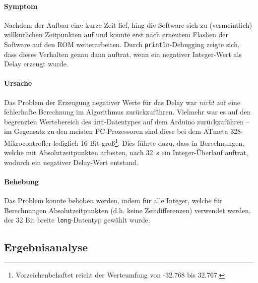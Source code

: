 \documentclass{kis}
\begin{document}
\paragraph{Symptom}
Nachdem der Aufbau eine kurze Zeit lief, hing die Software sich zu (vermeintlich) willkürlichen Zeitpunkten auf und konnte erst nach erneutem Flashen der Software auf den ROM weiterarbeiten. Durch \texttt{println}-Debugging zeigte sich, dass dieses Verhalten genau dann auftrat, wenn ein negativer Integer-Wert als Delay erzeugt wurde.

\paragraph{Ursache}
Das Problem der Erzeugung negativer Werte für das Delay war \emph{nicht} auf eine fehlerhafte Berechnung im Algorithmus zurückzuführen. Vielmehr war es auf den begrenzten Wertebereich des \texttt{int}-Datentypes auf dem Arduino zurückzuführen -- im Gegensatz zu den meisten PC-Prozessoren sind diese bei dem ATmeta 328-Mikrocontroller lediglich 16 Bit groß\footnote{Vorzeichenbehaftet reicht der Werteumfang von -32.768 bis 32.767.}. Dies führte dazu, dass in Berechnungen, welche mit Absolutzeitpunkten arbeiten, nach 32~s ein Integer-Überlauf auftrat, wodurch ein negativer Delay-Wert entstand.

\paragraph{Behebung}
Das Problem konnte behoben werden, indem für alle Integer, welche für Berechnungen Absolutzeitpunkten (d.h. keine Zeitdifferenzen) verwendet werden, der 32 Bit breite \texttt{long}-Datentyp gewählt wurde.

\subsection{Ergebnisanalyse}

\appendix
\end{document}

